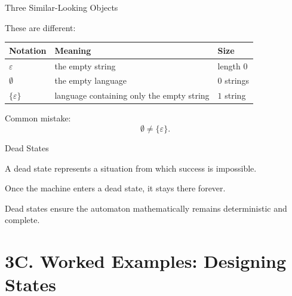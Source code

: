 \documentclass[10pt,aspectratio=169]{beamer}
\newcommand{\eps}{\varepsilon}
\begin{document}
\begin{frame}{Three Similar-Looking Objects}

These are different:

\vspace{0.5em}

\begin{center}
\begin{tabular}{lll}
\toprule
\textbf{Notation} & \textbf{Meaning} & \textbf{Size}\\
\midrule
$\eps$ & the empty string & length $0$\\
$\emptyset$ & the empty language & $0$ strings\\
$\{\eps\}$ & language containing only the empty string & $1$ string\\
\bottomrule
\end{tabular}
\end{center}


\vspace{1em}

Common mistake:
\[
\emptyset \ne \{\eps\}.
\]

\end{frame}

\begin{frame}{Dead States}

A dead state represents a situation from which success is impossible.


Once the machine enters a dead state, it stays there forever.

\begin{center}
\end{center}


Dead states ensure the automaton mathematically remains deterministic and complete.

\end{frame}

\section{3C. Worked Examples: Designing States}
\end{document}
